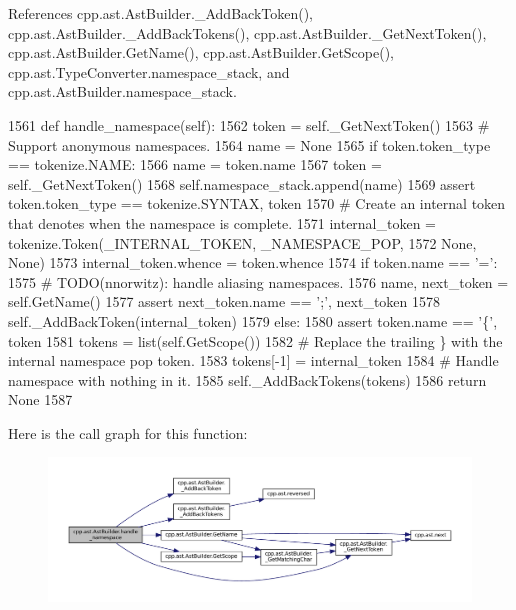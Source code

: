 References cpp.\+ast.\+Ast\+Builder.\+\_\+\+Add\+Back\+Token(), cpp.\+ast.\+Ast\+Builder.\+\_\+\+Add\+Back\+Tokens(), cpp.\+ast.\+Ast\+Builder.\+\_\+\+Get\+Next\+Token(), cpp.\+ast.\+Ast\+Builder.\+Get\+Name(), cpp.\+ast.\+Ast\+Builder.\+Get\+Scope(), cpp.\+ast.\+Type\+Converter.\+namespace\+\_\+stack, and cpp.\+ast.\+Ast\+Builder.\+namespace\+\_\+stack.


\begin{DoxyCode}
1561     \textcolor{keyword}{def }handle\_namespace(self):
1562         token = self.\_GetNextToken()
1563         \textcolor{comment}{# Support anonymous namespaces.}
1564         name = \textcolor{keywordtype}{None}
1565         \textcolor{keywordflow}{if} token.token\_type == tokenize.NAME:
1566             name = token.name
1567             token = self.\_GetNextToken()
1568         self.namespace\_stack.append(name)
1569         \textcolor{keyword}{assert} token.token\_type == tokenize.SYNTAX, token
1570         \textcolor{comment}{# Create an internal token that denotes when the namespace is complete.}
1571         internal\_token = tokenize.Token(\_INTERNAL\_TOKEN, \_NAMESPACE\_POP,
1572                                         \textcolor{keywordtype}{None}, \textcolor{keywordtype}{None})
1573         internal\_token.whence = token.whence
1574         \textcolor{keywordflow}{if} token.name == \textcolor{stringliteral}{'='}:
1575             \textcolor{comment}{# TODO(nnorwitz): handle aliasing namespaces.}
1576             name, next\_token = self.GetName()
1577             \textcolor{keyword}{assert} next\_token.name == \textcolor{stringliteral}{';'}, next\_token
1578             self.\_AddBackToken(internal\_token)
1579         \textcolor{keywordflow}{else}:
1580             \textcolor{keyword}{assert} token.name == \textcolor{stringliteral}{'\{'}, token
1581             tokens = list(self.GetScope())
1582             \textcolor{comment}{# Replace the trailing \} with the internal namespace pop token.}
1583             tokens[-1] = internal\_token
1584             \textcolor{comment}{# Handle namespace with nothing in it.}
1585             self.\_AddBackTokens(tokens)
1586         \textcolor{keywordflow}{return} \textcolor{keywordtype}{None}
1587 
\end{DoxyCode}
Here is the call graph for this function\+:
\nopagebreak
\begin{figure}[H]
\begin{center}
\leavevmode
\includegraphics[width=350pt]{classcpp_1_1ast_1_1AstBuilder_ae6dde01c5f9ac7ba3b14dff01cac66e4_cgraph}
\end{center}
\end{figure}
